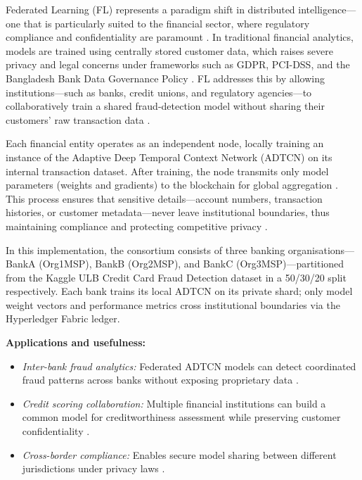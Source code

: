 Federated Learning (FL) represents a paradigm shift in distributed intelligence—one that is particularly suited to the financial sector, where regulatory compliance and confidentiality are paramount \cite{10746050}. In traditional financial analytics, models are trained using centrally stored customer data, which raises severe privacy and legal concerns under frameworks such as GDPR, PCI-DSS, and the Bangladesh Bank Data Governance Policy \cite{9404224}. FL addresses this by allowing institutions—such as banks, credit unions, and regulatory agencies—to collaboratively train a shared fraud-detection model without sharing their customers' raw transaction data \cite{10746050}.

Each financial entity operates as an independent node, locally training an instance of the Adaptive Deep Temporal Context Network (ADTCN) on its internal transaction dataset. After training, the node transmits only model parameters (weights and gradients) to the blockchain for global aggregation \cite{9945966}. This process ensures that sensitive details—account numbers, transaction histories, or customer metadata—never leave institutional boundaries, thus maintaining compliance and protecting competitive privacy \cite{10044098}.

In this implementation, the consortium consists of three banking organisations—BankA (Org1MSP), BankB (Org2MSP), and BankC (Org3MSP)—partitioned from the Kaggle ULB Credit Card Fraud Detection dataset in a 50/30/20 split respectively. Each bank trains its local ADTCN on its private shard; only model weight vectors and performance metrics cross institutional boundaries via the Hyperledger Fabric ledger.

\medskip
\textbf{Applications and usefulness:}
\begin{itemize}
    \item \textit{Inter-bank fraud analytics:} Federated ADTCN models can detect coordinated fraud patterns across banks without exposing proprietary data \cite{8850024}.
    \item \textit{Credit scoring collaboration:} Multiple financial institutions can build a common model for creditworthiness assessment while preserving customer confidentiality \cite{8850024}.
    \item \textit{Cross-border compliance:} Enables secure model sharing between different jurisdictions under privacy laws \cite{9404224}.
\end{itemize}

